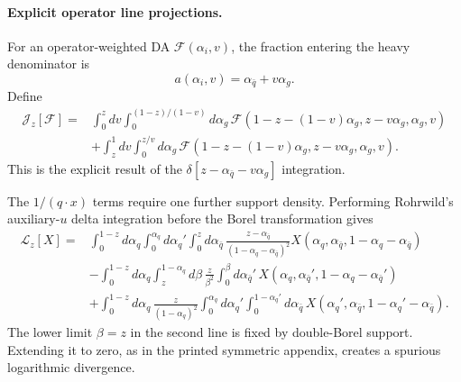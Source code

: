 \documentclass[11pt]{article}
\begin{document}
\paragraph{Explicit operator line projections.}
For an operator-weighted DA $\mathcal F(\alpha_i,v)$, the fraction entering
the heavy denominator is
\begin{equation}
 a(\alpha_i,v)=\alpha_{\bar q}+v\alpha_g .
\end{equation}
Define
\begin{align}
 \mathcal J_z[\mathcal F]={}&
 \int_0^z dv\int_0^{(1-z)/(1-v)}d\alpha_g\,
 \mathcal F(1-z-(1-v)\alpha_g,z-v\alpha_g,\alpha_g,v)
 \nonumber\\
 &+\int_z^1dv\int_0^{z/v}d\alpha_g\,
 \mathcal F(1-z-(1-v)\alpha_g,z-v\alpha_g,\alpha_g,v).
 \label{eq:operator-line-projection}
\end{align}
This is the explicit result of the
$\delta[z-\alpha_{\bar q}-v\alpha_g]$ integration.

The $1/(q\cdot x)$ terms require one further support density.  Performing
Rohrwild's auxiliary-$u$ delta integration before the Borel transformation
gives
\begin{align}
 \mathcal L_z[X]={}&
 \int_0^{1-z}d\alpha_q\int_0^{\alpha_q}d\alpha_q'
 \int_0^z d\alpha_{\bar q}\,
 \frac{z-\alpha_{\bar q}}{(1-\alpha_q-\alpha_{\bar q})^2}
 X(\alpha_q,\alpha_{\bar q},1-\alpha_q-\alpha_{\bar q})
 \nonumber\\
 &-\int_0^{1-z}d\alpha_q\int_z^{1-\alpha_q}d\beta\,
 \frac{z}{\beta^2}\int_0^\beta d\alpha_{\bar q}'\,
 X(\alpha_q,\alpha_{\bar q}',1-\alpha_q-\alpha_{\bar q}')
 \nonumber\\
 &+\int_0^{1-z}d\alpha_q\,\frac{z}{(1-\alpha_q)^2}
 \int_0^{\alpha_q}d\alpha_q'\int_0^{1-\alpha_q'}d\alpha_{\bar q}\,
 X(\alpha_q',\alpha_{\bar q},1-\alpha_q'-\alpha_{\bar q}).
 \label{eq:explicit-P-line-density}
\end{align}
The lower limit $\beta=z$ in the second line is fixed by double-Borel
support.  Extending it to zero, as in the printed symmetric appendix, creates
a spurious logarithmic divergence.
\end{document}
